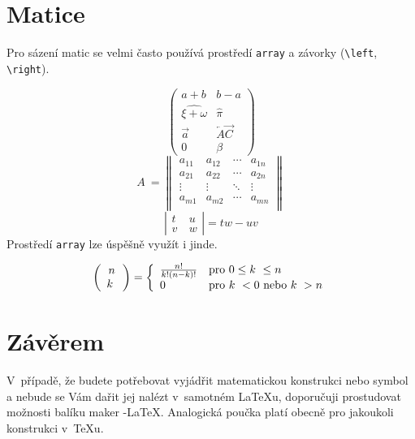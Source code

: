 \documentclass[11pt,a4paper,twocolumn]{article}
\theoremstyle{definition}
\theoremstyle{lemma}
\begin{document}
\section{Matice}
\label{matice}

\noindent Pro sázení matic se velmi často používá prostředí \texttt{array} a závorky (\verb|\left|, \verb|\right|). 

\[
  \left(
  \begin{array}{cc}
  a+b & b-a \\
  \widehat{\xi+\omega} & \hat{\pi} \\
  \vec{a} & \overleftarrow{A}\!\overrightarrow{C} \\
  0 & \beta
\end{array}
\right)
\]
\[ A~= 
  \left\|
  \begin{array}{cccc}
    a_{11} & a_{12} &\cdots &a_{1n}\\
    a_{21} & a_{22} &\cdots &a_{2n}\\
    \vdots & \vdots &\ddots &\vdots\\
    a_{m1} & a_{m2} &\cdots &a_{mn}\\
  \end{array}
  \right\|
\]
\[ \left|
  \begin{array}{cc}
    t & u\\
    v~& w
  \end{array}
  \right|
  =tw-uv
\]
\indent Prostředí \texttt{array} lze úspěšně využít i jinde.

\[
  \left(
  \begin{array}{c}
    n\\
    k~\end{array}
  \right)
  = \left\{
    \begin{array}{l l}
      \frac{n!}{k!(n-k)!} & \text{pro } 0 \leq k~\leq n \\
      0 & \text{pro } k~< 0 \text{ nebo } k~> n
    \end{array}
\right. 
  \]

\section{Závěrem}
\label{zaverem}

\noindent V~případě, že budete potřebovat vyjádřit matematickou konstrukci nebo symbol a
nebude se Vám dařit jej nalézt v~samotném \LaTeX u, doporučuji prostudovat možnosti balíku
maker \AmS-\LaTeX. Analogická poučka platí obecně pro jakoukoli konstrukci v~\TeX u.
\end{document}
